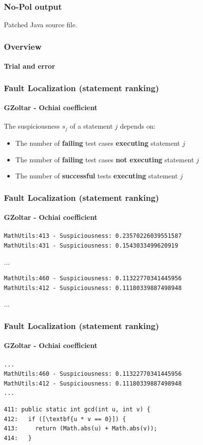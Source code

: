 \documentclass{beamer}
\begin{document}
\begin{frame}
\frametitle{No-Pol output}
Patched Java source file.
\end{frame}


\frame
{
    \frametitle{Overview}
    \framesubtitle{Trial and error}
  \begin{center}
  
  \end{center}
}


\begin{frame}
 
\end{frame}


\begin{frame}[fragile]
    \frametitle{Fault Localization (statement ranking)}
      \framesubtitle{GZoltar - Ochiai coefficient}
The suspiciousness $s_j$ of a statement $j$ depends on:
\begin{itemize}
 \item The number of \textbf{failing} test cases \textbf{executing} statement $j$ 
 \item The number of \textbf{failing} test cases \textbf{not executing} statement $j$
 \item The number of \textbf{successful} tests \textbf{executing} statement $j$
\end{itemize}
\end{frame}


\begin{frame}[fragile]
\frametitle{Fault Localization (statement ranking)}
\framesubtitle{GZoltar - Ochiai coefficient}
\begin{verbatim}
MathUtils:413 - Suspiciousness: 0.23570226039551587
MathUtils:431 - Suspiciousness: 0.1543033499620919
\end{verbatim}
...
\begin{verbatim}
MathUtils:460 - Suspiciousness: 0.11322770341445956
MathUtils:412 - Suspiciousness: 0.11180339887498948
\end{verbatim}
...
\end{frame}

\begin{frame}[fragile]
\frametitle{Fault Localization (statement ranking)}
\framesubtitle{GZoltar - Ochiai coefficient}
\begin{verbatim}
...
MathUtils:460 - Suspiciousness: 0.11322770341445956
MathUtils:412 - Suspiciousness: 0.11180339887498948
...
\end{verbatim}

\begin{lstlisting}[escapeinside=\[\]]
411: public static int gcd(int u, int v) {
412:   if ([\textbf{u * v == 0}]) {
413:     return (Math.abs(u) + Math.abs(v));
414:   }
\end{lstlisting}
\end{frame}
\end{document}
